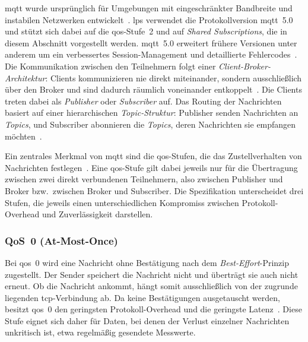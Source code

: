 \gls{mqtt} wurde ursprünglich für Umgebungen mit eingeschränkter Bandbreite und instabilen Netzwerken entwickelt~\citep{thangavel2014performance}. \gls{lps} verwendet die Protokollversion \gls{mqtt}~5.0 und stützt sich dabei auf die \gls{qos}-Stufe~2 und auf \textit{Shared Subscriptions}, die in diesem Abschnitt vorgestellt werden. \gls{mqtt}~5.0 erweitert frühere Versionen unter anderem um ein verbessertes Session-Management und detaillierte Fehlercodes~\citep{oasis2019mqtt, hivemq_mqtt5_essentials}. Die Kommunikation zwischen den Teilnehmern folgt einer \textit{Client-Broker-Architektur}: Clients kommunizieren nie direkt miteinander, sondern ausschließlich über den Broker und sind dadurch räumlich voneinander entkoppelt~\citep{eugster2003many, oasis2019mqtt}. Die Clients treten dabei als \textit{Publisher} oder \textit{Subscriber} auf. Das Routing der Nachrichten basiert auf einer hierarchischen \textit{Topic-Struktur}: Publisher senden Nachrichten an \textit{Topics}, und Subscriber abonnieren die \textit{Topics}, deren Nachrichten sie empfangen möchten~\citep{oasis2019mqtt, eugster2003many}.

\newpage

Ein zentrales Merkmal von \gls{mqtt} sind die \gls{qos}-Stufen, die das Zustellverhalten von Nachrichten festlegen~\citep{oasis2019mqtt}. Eine \gls{qos}-Stufe gilt dabei jeweils nur für die Übertragung zwischen zwei direkt verbundenen Teilnehmern, also zwischen Publisher und Broker bzw.~zwischen Broker und Subscriber. Die Spezifikation unterscheidet drei Stufen, die jeweils einen unterschiedlichen Kompromiss zwischen Protokoll-Overhead und Zuverlässigkeit darstellen.

\subsubsection{QoS~0 (At-Most-Once)}

Bei \gls{qos}~0 wird eine Nachricht ohne Bestätigung nach dem \textit{Best-Effort}-Prinzip zugestellt. Der Sender speichert die Nachricht nicht und überträgt sie auch nicht erneut. Ob die Nachricht ankommt, hängt somit ausschließlich von der zugrunde liegenden \gls{tcp}-Verbindung ab. Da keine Bestätigungen ausgetauscht werden, besitzt \gls{qos}~0 den geringsten Protokoll-Overhead und die geringste Latenz~\citep{oasis2019mqtt, hivemq_mqtt5_essentials}. Diese Stufe eignet sich daher für Daten, bei denen der Verlust einzelner Nachrichten unkritisch ist, etwa regelmäßig gesendete Messwerte.

\newpage

